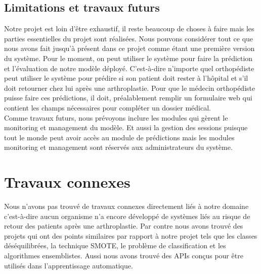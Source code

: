 \documentclass[12pt, french]{report}
\begin{document}
\section{Limitations et travaux futurs}
Notre projet est loin d'être exhaustif, il reste beaucoup de choses à faire mais les parties essentielles du projet sont réalisées. Nous pouvons considérer tout ce que nous avons fait jusqu'à présent dans ce projet comme étant une première version du système. Pour le moment, on peut utiliser le système pour faire la prédiction et l'évaluation de notre modèle déployé. C'est-à-dire n'importe quel orthopédiste peut utiliser le système pour prédire si son patient doit rester à l'hôpital et s'il doit retourner chez lui après une arthroplastie. Pour que le médecin orthopédiste puisse faire ces prédictions, il doit, préalablement remplir un formulaire web qui contient les champs nécessaires pour compléter un dossier médical.   \\

Comme travaux futurs, nous prévoyons inclure les modules qui gèrent le monitoring et management du modèle. Et aussi la gestion des sessions puisque tout le monde peut avoir accès au module de prédictions mais les modules monitoring et management sont réservés aux administrateurs du système.    
\newpage

\chapter{Travaux connexes} \label{chap:relatedworks}
Nous n'avons pas trouvé de travaux connexes directement liés à notre domaine c'est-à-dire aucun organisme n'a encore développé de systèmes liés au risque de retour des patients après une arthroplastie. Par contre nous avons trouvé des projets qui ont des points similaires par rapport à notre projet tels que les classes déséquilibrées, la technique SMOTE, le problème de classification et les algorithmes ensemblistes. Aussi nous avons trouvé des APIs conçus pour être utilisés dans l'apprentissage automatique.\\
\end{document}
